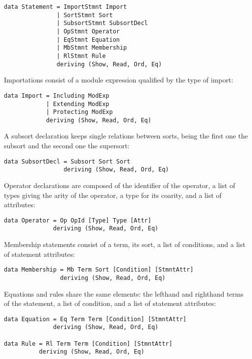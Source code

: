 {\codesize
\begin{verbatim}
data Statement = ImportStmnt Import
               | SortStmnt Sort
               | SubsortStmnt SubsortDecl
               | OpStmnt Operator
               | EqStmnt Equation
               | MbStmnt Membership
               | RlStmnt Rule
               deriving (Show, Read, Ord, Eq)
\end{verbatim}
}

Importations consist of a module expression qualified by the type
of import:

{\codesize
\begin{verbatim}
data Import = Including ModExp
            | Extending ModExp
            | Protecting ModExp
            deriving (Show, Read, Ord, Eq)
\end{verbatim}
}

A subsort declaration keeps single relations between sorts, being
the first one the subsort and the second one the supersort:

{\codesize
\begin{verbatim}
data SubsortDecl = Subsort Sort Sort
                 deriving (Show, Read, Ord, Eq)
\end{verbatim}
}

Operator declarations are composed of the identifier of the
operator, a list of types giving the arity of the operator,
a type for its coarity, and a list of attributes:

{\codesize
\begin{verbatim}
data Operator = Op OpId [Type] Type [Attr]
              deriving (Show, Read, Ord, Eq)
\end{verbatim}
}

Membership statements consist of a term, its sort, a list
of conditions, and a list of statement attributes:

{\codesize
\begin{verbatim}
data Membership = Mb Term Sort [Condition] [StmntAttr]
                deriving (Show, Read, Ord, Eq)
\end{verbatim}
}

Equations and rules share the same elements: the lefthand
and righthand terms of the statement, a list of condition,
and a list of statement attributes:

{\codesize
\begin{verbatim}
data Equation = Eq Term Term [Condition] [StmntAttr]
              deriving (Show, Read, Ord, Eq)

data Rule = Rl Term Term [Condition] [StmntAttr]
          deriving (Show, Read, Ord, Eq)
\end{verbatim}
}

